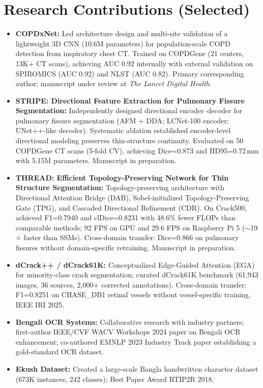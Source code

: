 \documentclass[11pt]{article}
\begin{document}
\section{Research Contributions (Selected)}
\begin{itemize}
  \item \textbf{COPDxNet:} Led architecture design and multi-site validation of a lightweight 3D CNN (10.6M parameters) for population-scale COPD detection from inspiratory chest CT. Trained on COPDGene (21 centers, 13K+ CT scans), achieving AUC 0.92 internally with external validation on SPIROMICS (AUC 0.92) and NLST (AUC 0.82). Primary corresponding author; manuscript under review at \textit{The Lancet Digital Health}.

  \item \textbf{STRIPE: Directional Feature Extraction for Pulmonary Fissure Segmentation:} Independently designed directional encoder--decoder for pulmonary fissure segmentation (AFM + DDA; LCNet-100 encoder; UNet++-like decoder). Systematic ablation established encoder-level directional modeling preserves thin-structure continuity. Evaluated on 50 COPDGene CT scans (5-fold CV), achieving Dice=0.873 and HD95=0.72\,mm with 5.15M parameters. Manuscript in preparation.

  \item \textbf{THREAD: Efficient Topology-Preserving Network for Thin Structure Segmentation:} Topology-preserving architecture with Directional Attention Bridge (DAB), Sobel-initialized Topology-Preserving Gate (TPG), and Cascaded Directional Refinement (CDR). On Crack500, achieved F1=0.7940 and clDice=0.8231 with 48.6\% fewer FLOPs than comparable methods; 92 FPS on GPU and 29.6 FPS on Raspberry Pi 5 ($\sim$19$\times$ faster than SSMs). Cross-domain transfer: Dice=0.866 on pulmonary fissures without domain-specific retraining. Manuscript in preparation.

  \item \textbf{dCrack++ / dCrack61K:} Conceptualized Edge-Guided Attention (EGA) for minority-class crack segmentation; curated dCrack61K benchmark (61,943 images, 36 sources, 2,000+ corrected annotations). Cross-domain transfer: F1=0.8251 on CHASE\_DB1 retinal vessels without vessel-specific training. IEEE IRI 2025.

  \item \textbf{Bengali OCR Systems:} Collaborative research with industry partners; first-author IEEE/CVF WACV Workshops 2024 paper on Bengali OCR enhancement; co-authored EMNLP 2023 Industry Track paper establishing a gold-standard OCR dataset.

  \item \textbf{Ekush Dataset:} Created a large-scale Bangla handwritten character dataset (673K instances, 242 classes); Best Paper Award RTIP2R 2018.
\end{itemize}
\end{document}
